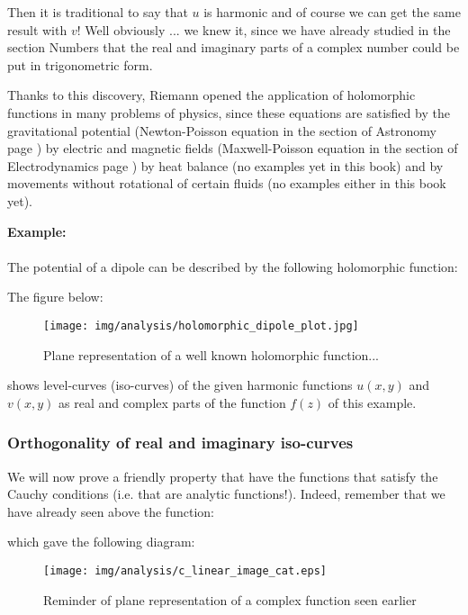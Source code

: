 	Then it is traditional to say that $u$ is harmonic and of course we can get the same result with $v$! Well obviously ... we knew it, since we have already studied in the section Numbers that the real and imaginary parts of a complex number could be put in trigonometric form.

	Thanks to this discovery, Riemann opened the application of holomorphic functions in many problems of physics, since these equations are satisfied by the gravitational potential (Newton-Poisson equation in the section of Astronomy page \pageref{newton-poisson equation}) by electric and magnetic fields (Maxwell-Poisson equation in the section of Electrodynamics page \pageref{maxwell-poisson equation}) by heat balance (no examples yet in this book) and by movements without rotational of certain fluids (no examples either in this book yet).

	
	\begin{tcolorbox}[colframe=black,colback=white,sharp corners,breakable]
	\textbf{{\Large {}}Example:}\\\\
	The potential of a dipole can be described by the following holomorphic function:
	
	The figure below:
	\begin{figure}[H]
		\centering
		\texttt{[image: img/analysis/holomorphic\_dipole\_plot.jpg]}
		\caption{Plane representation of a well known holomorphic function...}
	\end{figure}
	shows level-curves (iso-curves) of the given harmonic functions $u (x, y)$ and $v (x, y)$ as real and complex parts of the function $f (z)$ of this example.
	\end{tcolorbox}
	
	
	\pagebreak
	\subsubsection{Orthogonality of real and imaginary iso-curves}
	We will now prove a friendly property that have the functions that satisfy the Cauchy conditions (i.e. that are analytic functions!). Indeed, remember that we have already seen above the function:
	
	which gave the following diagram:
	\begin{figure}[H]
		\begin{center}
			\texttt{[image: img/analysis/c\_linear\_image\_cat.eps]}
		\end{center}	
		\caption[]{Reminder of plane representation of a complex function seen earlier}
	\end{figure}
	
